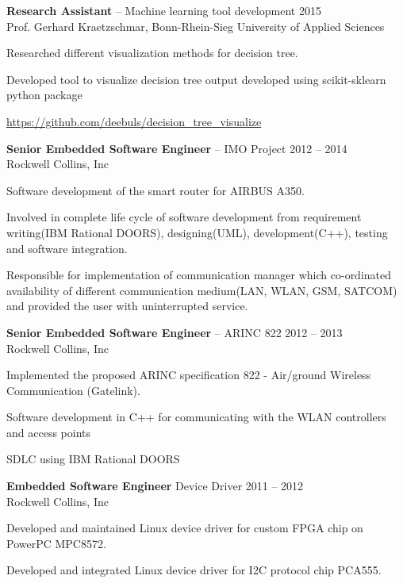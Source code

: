 \documentclass{article}
\newcommand{\employer}[4]{{
\vspace*{2pt}%
\textbf{#1} #2 \hfill #3\\ #4 \vspace*{2pt}}
}
\renewcommand{\labelitemii}{
$\vcenter{\hbox{\tiny$\bullet$}}$\hspace*{-3pt}
}
\newenvironment{bullet-list-minor}{
\begin{list}{\labelitemii}{\setlength\leftmargin{15pt} 
\topsep 0pt \itemsep -2pt}}{\vspace*{4pt}\end{list}
}
\begin{document}
    \employer{Research Assistant}{-- Machine learning tool development}{2015}
    {Prof. Gerhard Kraetzschmar, Bonn-Rhein-Sieg University of Applied Sciences}
    \begin{bullet-list-minor}
    \item Researched different visualization methods for decision tree.
    \item Developed tool to visualize decision tree output developed using scikit-sklearn python package
    \item \url{https://github.com/deebuls/decision\_tree\_visualize}
    \end{bullet-list-minor}
    \employer{Senior Embedded Software Engineer}{-- IMO Project}{2012 -- 2014}
    {Rockwell Collins, Inc}
    \begin{bullet-list-minor}
    \item Software development of the smart router for AIRBUS A350.
    \item Involved in complete life cycle of software development from
requirement writing(IBM Rational DOORS), designing(UML), development(C++), testing and software
integration.
    \item Responsible for implementation of communication manager which co-ordinated availability of different communication medium(LAN, WLAN, GSM, SATCOM) and provided the user with uninterrupted service.
    \end{bullet-list-minor}
    \employer{Senior Embedded Software Engineer}{-- ARINC  822}{2012 -- 2013}
    {Rockwell Collins, Inc}
    \begin{bullet-list-minor}
    \item Implemented the proposed ARINC specification 822 - Air/ground
Wireless Communication (Gatelink).
    \item Software development in C++ for communicating with the WLAN controllers and
access points
    \item SDLC using IBM Rational DOORS
    \end{bullet-list-minor}
\newpage
    \employer{Embedded Software Engineer}{Device Driver }{2011 -- 2012}
    {Rockwell Collins, Inc}
    \begin{bullet-list-minor}
    \item Developed and maintained Linux device driver for custom FPGA chip on PowerPC MPC8572.
    \item Developed and integrated Linux device driver for I2C protocol chip PCA555.
    \end{bullet-list-minor}
\end{document}

